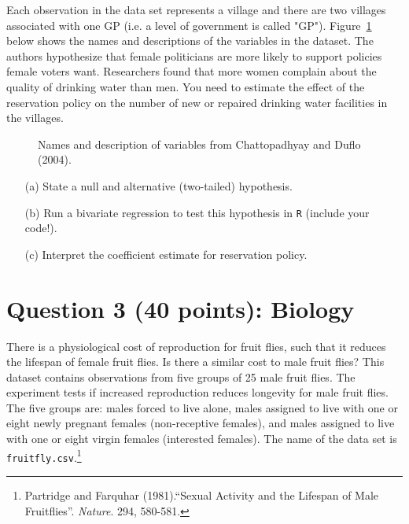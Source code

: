 \documentclass[12pt,letterpaper]{article}
\begin{document}
	\noindent Each observation in the data set represents a village and there are two villages associated with one GP (i.e. a level of government is called "GP"). Figure~\ref{fig:women_desc} below shows the names and descriptions of the variables in the dataset. The authors hypothesize that female politicians are more likely to support policies female voters want. Researchers found that more women complain about the quality of drinking water than men. You need to estimate the effect of the reservation policy on the number of new or repaired drinking water facilities in the villages.
	\vspace{.5cm}
	\begin{figure}[h!]
		\caption{\footnotesize{Names and description of variables from Chattopadhyay and Duflo (2004).}}
		\vspace{.5cm}
		\centering
		\label{fig:women_desc}
	\end{figure}		
	
	\newpage
	\begin{enumerate}
		\item [(a)] State a null and alternative (two-tailed) hypothesis. 
		
		\vspace{6cm}
		\item [(b)] Run a bivariate regression to test this hypothesis in \texttt{R} (include your code!).
		
		\vspace{6cm}
		\item [(c)] Interpret the coefficient estimate for reservation policy. 
	\end{enumerate}
	
	\newpage
	\section*{Question 3 (40 points): Biology}
	
	There is a physiological cost of reproduction for fruit flies, such that it reduces the lifespan of female fruit flies.  Is there a similar cost to male fruit flies?  This dataset contains observations from five groups of 25 male fruit flies. The experiment tests if increased reproduction reduces longevity for male fruit flies. The five groups are: males forced to live alone, males assigned to live with one or eight newly pregnant females (non-receptive females), and males assigned to live with one or eight virgin females (interested females). The name of the data set is \texttt{fruitfly.csv}.\footnote{Partridge and Farquhar (1981).``Sexual Activity and the Lifespan of Male Fruitflies''. \textit{Nature}. 294, 580-581.}
	\vspace{1cm}
	
\end{document}

